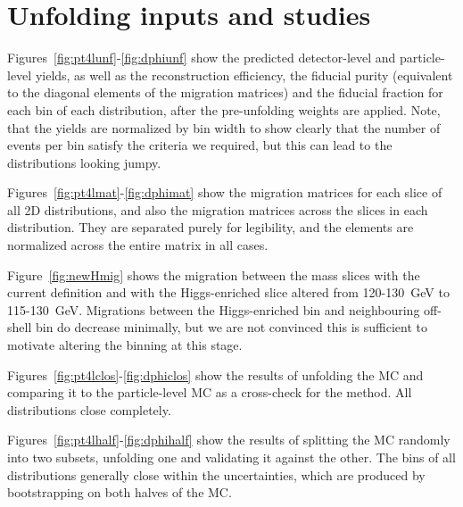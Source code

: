 \chapter{Unfolding inputs and studies}
\label{app:moreunf}
Figures~\ref{fig:pt4lunf}-\ref{fig:dphiunf} show the predicted detector-level and particle-level yields, as well as the reconstruction efficiency, the fiducial purity (equivalent to the diagonal elements of the migration matrices) and the fiducial fraction for each bin of each distribution, after the pre-unfolding weights are applied. Note, that the yields are normalized by bin width to show clearly that the number of events per bin satisfy the criteria we required, but this can lead to the distributions looking jumpy.

Figures~\ref{fig:pt4lmat}-\ref{fig:dphimat} show the migration matrices for each slice of all 2D distributions, and also the migration matrices across the slices in each distribution. They are separated purely for legibility, and the elements are normalized across the entire matrix in all cases. 

Figure~\ref{fig:newHmig} shows the migration between the \mFourL mass slices with the current definition and with the Higgs-enriched slice altered from 120-130~GeV to 115-130~GeV. Migrations between the Higgs-enriched bin and neighbouring off-shell bin do decrease minimally, but we are not convinced this is sufficient to motivate altering the binning at this stage.

Figures~\ref{fig:pt4lclos}-\ref{fig:dphiclos} show the results of unfolding the MC and comparing it to the particle-level MC as a cross-check for the method. All distributions close completely. 

Figures~\ref{fig:pt4lhalf}-\ref{fig:dphihalf} show the results of splitting the MC randomly into two subsets, unfolding one and validating it against the other. The bins of all distributions generally close within the uncertainties, which are produced by bootstrapping on both halves of the MC. 

